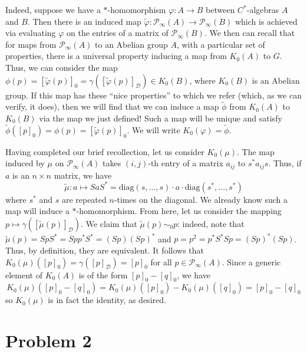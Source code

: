 \documentclass[aps,pra,showpacs,notitlepage,onecolumn,superscriptaddress,nofootinbib]{revtex4-1}
\newcommand{\hhrulefill}{\hspace{-1.0em}\hrulefill}
\theoremstyle{definition}
\begin{document}
\noindent Indeed, suppose we have a $*$-homomorphism $\varphi : A \rightarrow B$ between $C^{*}$-algebras $A$ and $B$. Then there is an induced map
$\widetilde{\varphi} : \mathcal{P}_{\infty}(A) \rightarrow \mathcal{P}_{\infty}(B)$ which is achieved via evaluating $\varphi$ on the entries of a matrix of $\mathcal{P}_{\infty}(B)$.
We then can recall that for maps from $\mathcal{P}_{\infty}(A)$ to an Abelian group $A$, with a particular set of properties, there is a universal property inducing a map from $K_0(A)$
to $G$. Thus, we can consider the map $\phi(p) = [\widetilde{\varphi}(p)]_0 = \gamma([\widetilde{\varphi}(p)]_{\mathcal{D}}) \in K_0(B)$, where $K_0(B)$ is an Abelian group. If this map has these ``nice properties'' to which
we refer (which, as we can verify, it does), then we will find that we can induce a map $\widetilde{\phi}$ from $K_0(A)$ to $K_0(B)$ via the map we just defined! Such a map will be unique and satisfy $\widetilde{\phi}([p]_0) = \phi(p) = [\widetilde{\varphi}(p)]_0$.
We will write $K_0(\varphi) = \widetilde{\phi}$.
\newline

\noindent Having completed our brief recollection, let us consider $K_0(\mu)$. The map induced by $\mu$ on $\mathcal{P}_\infty(A)$ takes $(i, j)$-th entry of a matrix $a_{ij}$
to $s^{*} a_{ij} s$. Thus, if $a$ is an $n \times n$ matrix, we have
\begin{equation}
  \widetilde{\mu} : a \mapsto S a S^{*} = \text{diag}(s, \dots, s) \cdot a \cdot \text{diag}(s^{*}, \dots, s^{*})
\end{equation}
where $s^{*}$ and $s$ are repeated $n$-times on the diagonal. We already know such a map will induce a $*$-homomorphism. From here, let us consider the mapping $p \mapsto \gamma([\widetilde{\mu}(p)]_{\mathcal{D}})$.
We claim that $\widetilde{\mu}(p) \sim_0 p$: indeed, note that $\widetilde{\mu}(p) = S p S^{*} = S p p^{*} S^{*} = (S p) (S p)^{*}$ and $p = p^2 = p^{*} S^{*} S p = (Sp)^{*} (Sp)$. Thus, by definition, they are equivalent.
It follows that $K_0(\mu)([p]_0) = \gamma([p]_{\mathcal{D}}) = [p]_0$ for all $p \in \mathcal{P}_{\infty}(A)$. Since a generic element of $K_0(A)$ is of the form $[p]_0 - [q]_0$, we have
\begin{equation}
  K_0(\mu)([p]_0 - [q]_0) = K_0(\mu)([p]_0) - K_0(\mu)([q]_0) = [p]_0 - [q]_0
\end{equation}
so $K_0(\mu)$ is in fact the identity, as desired.

\hhrulefill

\section{Problem 2}
\end{document}

